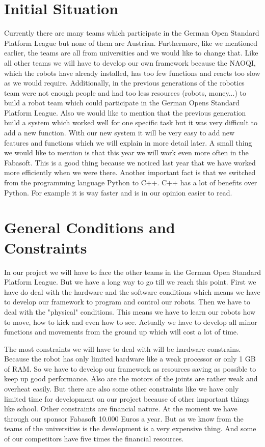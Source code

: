 \documentclass[12pt]{article}
\theoremstyle{definition}
\begin{document}
\section{Initial Situation}


Currently there are many teams which participate in the German Open Standard Platform League but none of them are Austrian. Furthermore, like we mentioned earlier, the teams are all from universities and we would like to change that. Like all other teams we will have to develop our own framework because the NAOQI, which the robots have already installed, has too few functions and reacts too slow as we would require. Additionally, in the previous generations of the robotics team were not enough people and had too less resources (robots, money...) to build a robot team which could participate in the German Opens Standard Platform League. Also we would like to mention that the previous generation build a system which worked well for one specific task but it was very difficult to add a new function. With our new system it will be very easy to add new features and functions which we will explain in more detail later. A small thing we would like to mention is that this year we will work even more often in the Fabasoft. This is a good thing because we noticed last year that we have worked more efficiently when we were there. Another important fact is that we switched from the programming language Python to C++. C++ has a lot of benefits over Python. For example it is way faster and is in our opinion easier to read. 


\pagebreak

\section{General Conditions and Constraints}

In our project we will have to face the other teams in the German Open Standard Platform League. But we have a long way to go till we reach this point. First we have do deal with the hardware and the software conditions which means we have to develop our framework to program and control our robots. Then we have to deal with the "physical" conditions. This means we have to learn our robots how to move, how to kick and even how to see. Actually we have to develop all minor functions and movements from the ground up which will cost a lot of time.\linebreak

The most constraints we will have to deal with will be hardware constrains. Because the robot has only limited hardware like a weak processor or only 1 GB of RAM. So we have to develop our framework as resources saving as possible to keep up good performance. Also are the motors of the joints are rather weak and overheat easily. But there are also some other constraints like we have only limited time for development on our project because of other important things like school. Other constraints are financial nature. At the moment we have through our sponsor Fabasoft 10.000 Euros a year. But as we know from the teams of the universities is the development is a very expensive thing. And some of our competitors have five times the financial resources.
\end{document}
